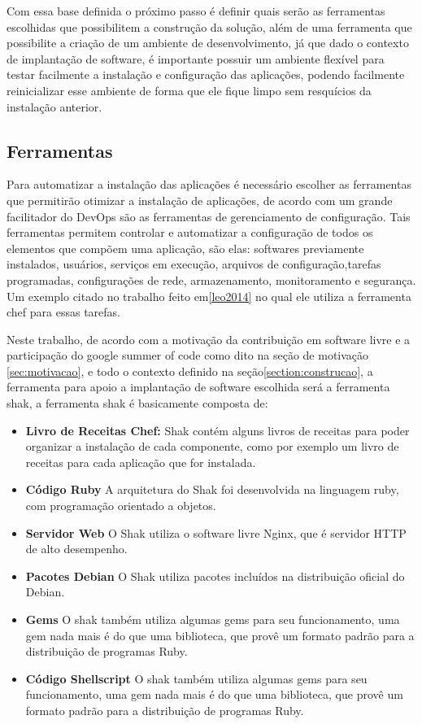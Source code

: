 Com essa base definida o próximo passo é definir quais serão as ferramentas
escolhidas que possibilitem a construção da solução, além de uma ferramenta
que possibilite a criação de um ambiente de desenvolvimento, já que dado o
contexto de implantação de software, é importante possuir um ambiente flexível
para testar facilmente a instalação e configuração das aplicações,
podendo facilmente reinicializar esse ambiente de forma que ele fique limpo sem
resquícios da instalação anterior.

\subsection{Ferramentas}

Para automatizar a instalação das aplicações é necessário escolher as ferramentas
que permitirão otimizar a instalação de aplicações, de acordo com\cite{6265084}
um grande facilitador do DevOps são as ferramentas de gerenciamento de configuração.
Tais ferramentas permitem controlar e automatizar a configuração de todos os
elementos que compõem uma aplicação, são elas: softwares previamente instalados,
usuários, serviços em execução, arquivos de configuração,tarefas programadas,
configurações de rede, armazenamento, monitoramento e segurança. Um exemplo citado
no trabalho feito em\ref{leo2014} no qual ele utiliza a ferramenta chef para
essas tarefas.

Neste trabalho, de acordo com a motivação da contribuição em software livre
e a participação do google summer of code como dito na seção de motivação
\ref{sec:motivacao}, e todo o contexto definido na seção\ref{section:construcao},
a ferramenta para apoio a implantação de software escolhida
será a ferramenta shak, a ferramenta shak é basicamente composta de:

\begin{itemize}
  \item  \textbf{Livro de Receitas Chef:} Shak contém alguns livros de receitas
  para poder organizar a instalação de cada componente, como por exemplo um livro
  de receitas para cada aplicação que for instalada.
  \item  \textbf{Código Ruby} A arquitetura do Shak foi desenvolvida na linguagem
  ruby, com programação orientado a objetos.
  \item  \textbf{Servidor Web} O Shak utiliza o software livre Nginx, que é
  servidor HTTP de alto desempenho\cite{nginx}.
  \item  \textbf{Pacotes Debian} O Shak utiliza pacotes incluídos na distribuição
  oficial do Debian.
  \item  \textbf{Gems} O shak também utiliza algumas gems para seu funcionamento,
  uma gem nada mais é do que uma biblioteca, que provê um formato padrão para
  a distribuição de programas Ruby\cite{gem}.
  \item  \textbf{Código Shellscript} O shak também utiliza algumas gems para seu funcionamento,
  uma gem nada mais é do que uma biblioteca, que provê um formato padrão para
  a distribuição de programas Ruby\cite{gem}.
\end{itemize}

